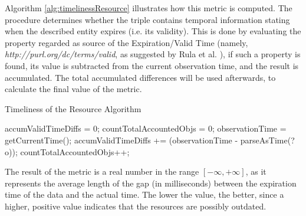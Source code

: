Algorithm \ref{alg:timelinessResource} illustrates how this metric is computed. The procedure determines whether the triple contains  temporal information stating when the described entity expires (i.e. its validity). This is done by evaluating the property regarded as source  of the Expiration/Valid Time (namely, \textit{http://purl.org/dc/terms/valid}, as suggested by Rula et al. \cite{Rula2012}), if such a property is found, its value is subtracted from the current observation time, and the result is accumulated. The total accumulated differences will be used afterwards, to calculate the final value of the metric.
\begin{algorithm}
\caption{Timeliness of the Resource Algorithm} \label{alg:timelinessResource}
\begin{algorithmic}[1]
\State accumValidTimeDiffs = 0;
\State countTotalAccountedObjs = 0;
\State observationTime = getCurrentTime();
\EndProcedure
{}
\State accumValidTimeDiffs += (observationTime - parseAsTime(?o));
\State countTotalAccountedObjs++;
\EndIf
\EndProcedure
\end{algorithmic}
\end{algorithm}
The result of the metric is a real number in the range $[-\infty, +\infty]$, as it represents the average length of the gap (in  milliseconds) between the expiration time of the data and the actual time. The lower the value, the better, since a higher, positive value indicates that the resources are possibly outdated.


